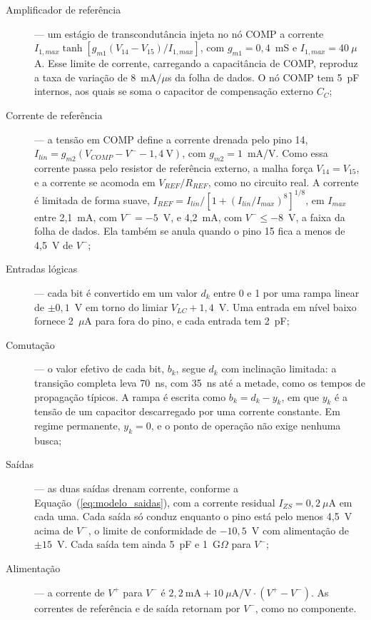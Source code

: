\begin{description}
	\item[Amplificador de referência] --- um estágio de transcondutância injeta no nó COMP a corrente \(I_{1,max} \tanh\!\left[g_{m1} (V_{14} - V_{15}) / I_{1,max}\right]\), com \(g_{m1} = 0{,}4\)~mS e \(I_{1,max} = 40~\mu\)A. Esse limite de corrente, carregando a capacitância de COMP, reproduz a taxa de variação de 8~mA/\(\mu\)s da folha de dados. O nó COMP tem 5~pF internos, aos quais se soma o capacitor de compensação externo \(C_C\);
	\item[Corrente de referência] --- a tensão em COMP define a corrente drenada pelo pino 14, \(I_{lin} = g_{m2} (V_{COMP} - V^- - 1{,}4~\text{V})\), com \(g_{m2} = 1\)~mA/V. Como essa corrente passa pelo resistor de referência externo, a malha força \(V_{14} = V_{15}\), e a corrente se acomoda em \(V_{REF}/R_{REF}\), como no circuito real. A corrente é limitada de forma suave, \(I_{REF} = I_{lin} / [1 + (I_{lin}/I_{max})^8]^{1/8}\), em \(I_{max}\) entre 2,1~mA, com \(V^- = -5\)~V, e 4,2~mA, com \(V^- \le -8\)~V, a faixa da folha de dados. Ela também se anula quando o pino 15 fica a menos de 4,5~V de \(V^-\);
	\item[Entradas lógicas] --- cada bit é convertido em um valor \(d_k\) entre 0 e 1 por uma rampa linear de \(\pm 0{,}1\)~V em torno do limiar \(V_{LC} + 1{,}4\)~V. Uma entrada em nível baixo fornece 2~\(\mu\)A para fora do pino, e cada entrada tem 2~pF;
	\item[Comutação] --- o valor efetivo de cada bit, \(b_k\), segue \(d_k\) com inclinação limitada: a transição completa leva 70~ns, com 35~ns até a metade, como os tempos de propagação típicos. A rampa é escrita como \(b_k = d_k - y_k\), em que \(y_k\) é a tensão de um capacitor descarregado por uma corrente constante. Em regime permanente, \(y_k = 0\), e o ponto de operação não exige nenhuma busca;
	\item[Saídas] --- as duas saídas drenam corrente, conforme a Equação~(\ref{eq:modelo_saidas}), com a corrente residual \(I_{ZS} = 0{,}2~\mu\)A em cada uma. Cada saída só conduz enquanto o pino está pelo menos 4,5~V acima de \(V^-\), o limite de conformidade de \(-10{,}5\)~V com alimentação de \(\pm15\)~V. Cada saída tem ainda 5~pF e 1~G\(\Omega\) para \(V^-\);
	\item[Alimentação] --- a corrente de \(V^+\) para \(V^-\) é \(2{,}2~\text{mA} + 10~\mu\text{A/V} \cdot (V^+ - V^-)\). As correntes de referência e de saída retornam por \(V^-\), como no componente.
\end{description}

